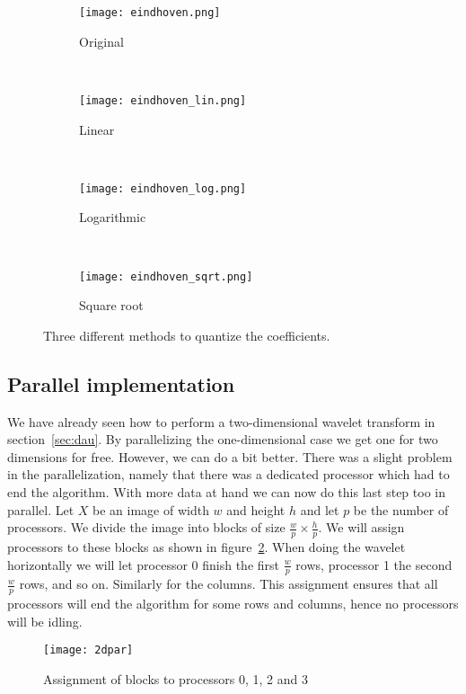 \begin{figure}
	\begin{subfigure}[b]{0.25\textwidth}
		\centering
		\texttt{[image: eindhoven.png]}
		\caption{Original}
	\end{subfigure}~
	\begin{subfigure}[b]{0.25\textwidth}
		\centering
		\texttt{[image: eindhoven\_lin.png]}
		\caption{Linear}
	\end{subfigure}~
	\begin{subfigure}[b]{0.25\textwidth}
		\centering
		\texttt{[image: eindhoven\_log.png]}
		\caption{Logarithmic}
	\end{subfigure}~
	\begin{subfigure}[b]{0.25\textwidth}
		\centering
		\texttt{[image: eindhoven\_sqrt.png]}
		\caption{Square root}
	\end{subfigure}
	\caption{Three different methods to quantize the coefficients.}
	\label{fig:quantization}
\end{figure}


\subsection{Parallel implementation}
We have already seen how to perform a two-dimensional wavelet transform in section~\ref{sec:dau}. By parallelizing the one-dimensional case we get one for two dimensions for free. However, we can do a bit better. There was a slight problem in the parallelization, namely that there was a dedicated processor which had to end the algorithm. With more data at hand we can now do this last step too in parallel. Let $X$ be an image of width $w$ and height $h$ and let $p$ be the number of processors. We divide the image into blocks of size $\frac{w}{p}\times\frac{h}{p}$. We will assign processors to these blocks as shown in figure~\ref{fig:par2d}. When doing the wavelet horizontally we will let processor 0 finish the first $\frac{w}{p}$ rows, processor 1 the second $\frac{w}{p}$ rows, and so on. Similarly for the columns. This assignment ensures that all processors will end the algorithm for some rows and columns, hence no processors will be idling.

\begin{figure}
	\centering
	\texttt{[image: 2dpar]}
	\caption{Assignment of blocks to processors 0, 1, 2 and 3}
	\label{fig:par2d}
\end{figure}

